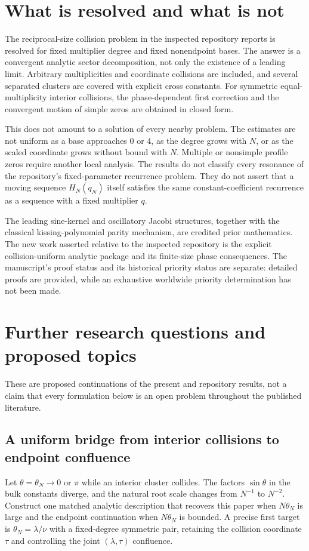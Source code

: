 \documentclass[11pt,a4paper]{article}
\numberwithin{equation}{section}
\theoremstyle{definition}
\theoremstyle{remark}
\begin{document}
\section{What is resolved and what is not}\label{ic:sec:scope}
The reciprocal-size collision problem in the inspected repository
reports is resolved for fixed multiplier degree and fixed nonendpoint
bases. The answer is a convergent analytic sector decomposition, not
only the existence of a leading limit. Arbitrary multiplicities and
coordinate collisions are included, and several separated clusters are
covered with explicit cross constants. For symmetric equal-multiplicity
interior collisions, the phase-dependent first correction and the
convergent motion of simple zeros are obtained in closed form.

This does not amount to a solution of every nearby problem. The estimates
are not uniform as a base approaches $0$ or $4$, as the degree grows
with $N$, or as the scaled coordinate grows without bound with $N$.
Multiple or nonsimple profile zeros require another local analysis.
The results do not classify every resonance of the repository's
fixed-parameter recurrence problem. They do not assert that a moving
sequence $H_N(q_N)$ itself satisfies the same constant-coefficient
recurrence as a sequence with a fixed multiplier $q$.

The leading sine-kernel and oscillatory Jacobi structures, together with
the classical kissing-polynomial parity mechanism, are credited prior
mathematics. The new work asserted relative to the inspected repository
is the explicit collision-uniform analytic package and its finite-size
phase consequences. The manuscript's proof status and its historical
priority status are separate: detailed proofs are provided, while an
exhaustive worldwide priority determination has not been made.

\section{Further research questions and proposed topics}\label{ic:sec:research}
These are proposed continuations of the present and repository results,
not a claim that every formulation below is an open problem throughout
the published literature.

\subsection{A uniform bridge from interior collisions to endpoint confluence}\label{ic:x:bridge}
Let $\theta=\theta_N\to0$ or $\pi$ while an interior cluster collides.
The factors $\sin\theta$ in the bulk constants diverge, and the natural
root scale changes from $N^{-1}$ to $N^{-2}$. Construct one matched
analytic description that recovers this paper when $N\theta_N$ is large
and the endpoint continuation when $N\theta_N$ is bounded. A precise
first target is $\theta_N=\lambda/\nu$ with a fixed-degree symmetric
pair, retaining the collision coordinate $\tau$ and controlling the
joint $(\lambda,\tau)$ confluence.
\end{document}
